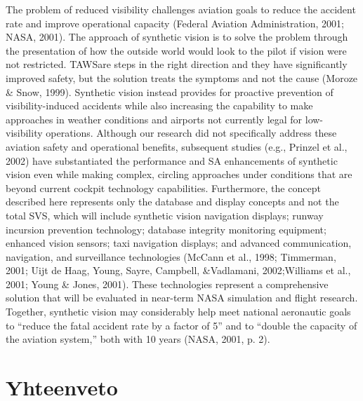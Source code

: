 \documentclass[utf8,bachelor,manualbib]{gradu3}
\begin{document}
The problem of reduced visibility challenges aviation goals to reduce the accident
rate and improve operational capacity (Federal Aviation Administration, 2001;
NASA, 2001). The approach of synthetic vision is to solve the problem through the
presentation of how the outside world would look to the pilot if vision were not restricted.
TAWSare steps in the right direction and they have significantly improved
safety, but the solution treats the symptoms and not the cause (Moroze \& Snow,
1999). Synthetic vision instead provides for proactive prevention of visibility-induced
accidents while also increasing the capability to make approaches in
weather conditions and airports not currently legal for low-visibility operations.
Although our research did not specifically address these aviation safety and operational
benefits, subsequent studies (e.g., Prinzel et al., 2002) have substantiated the
performance and SA enhancements of synthetic vision even while making complex,
circling approaches under conditions that are beyond current cockpit technology
capabilities. Furthermore, the concept described here represents only the
database and display concepts and not the total SVS, which will include synthetic
vision navigation displays; runway incursion prevention technology; database integrity
monitoring equipment; enhanced vision sensors; taxi navigation displays;
and advanced communication, navigation, and surveillance technologies
(McCann et al., 1998; Timmerman, 2001; Uijt de Haag, Young, Sayre, Campbell,
\&Vadlamani, 2002;Williams et al., 2001; Young \& Jones, 2001). These technologies
represent a comprehensive solution that will be evaluated in near-term NASA
simulation and flight research. Together, synthetic vision may considerably help
meet national aeronautic goals to “reduce the fatal accident rate by a factor of 5”
and to “double the capacity of the aviation system,” both with 10 years (NASA,
2001, p. 2). \citep{prinzel2004}


\chapter{Yhteenveto}
\end{document}
